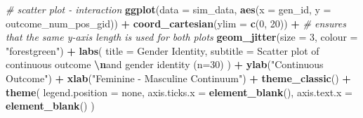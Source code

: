\documentclass[
]{book}
\newenvironment{Shaded}{\begin{snugshade}}{\end{snugshade}}
\newcommand{\AttributeTok}[1]{\textcolor[rgb]{0.13,0.29,0.53}{#1}}
\newcommand{\CommentTok}[1]{\textcolor[rgb]{0.56,0.35,0.01}{\textit{#1}}}
\newcommand{\DecValTok}[1]{\textcolor[rgb]{0.00,0.00,0.81}{#1}}
\newcommand{\FunctionTok}[1]{\textcolor[rgb]{0.13,0.29,0.53}{\textbf{#1}}}
\newcommand{\NormalTok}[1]{#1}
\newcommand{\SpecialCharTok}[1]{\textcolor[rgb]{0.81,0.36,0.00}{\textbf{#1}}}
\newcommand{\StringTok}[1]{\textcolor[rgb]{0.31,0.60,0.02}{#1}}
\begin{document}
\begin{Shaded}
\begin{Highlighting}[]
\CommentTok{\# scatter plot {-} interaction}
\FunctionTok{ggplot}\NormalTok{(}\AttributeTok{data =}\NormalTok{ sim\_data, }\FunctionTok{aes}\NormalTok{(}\AttributeTok{x =}\NormalTok{ gen\_id, }\AttributeTok{y =}\NormalTok{ outcome\_num\_pos\_gid)) }\SpecialCharTok{+}
  \FunctionTok{coord\_cartesian}\NormalTok{(}\AttributeTok{ylim =} \FunctionTok{c}\NormalTok{(}\DecValTok{0}\NormalTok{, }\DecValTok{20}\NormalTok{)) }\SpecialCharTok{+} \CommentTok{\# ensures that the same y{-}axis length is used for both plots}
  \FunctionTok{geom\_jitter}\NormalTok{(}\AttributeTok{size =} \DecValTok{3}\NormalTok{, }\AttributeTok{colour =} \StringTok{"forestgreen"}\NormalTok{) }\SpecialCharTok{+}
  \FunctionTok{labs}\NormalTok{(}
    \AttributeTok{title =} \StringTok{\textquotesingle{}Gender Identity\textquotesingle{}}\NormalTok{,}
    \AttributeTok{subtitle =} \StringTok{\textquotesingle{}Scatter plot of continuous outcome }\SpecialCharTok{\textbackslash{}n}\StringTok{and gender identity (n=30)\textquotesingle{}}
\NormalTok{    ) }\SpecialCharTok{+}
  \FunctionTok{ylab}\NormalTok{(}\StringTok{"Continuous Outcome"}\NormalTok{) }\SpecialCharTok{+} \FunctionTok{xlab}\NormalTok{(}\StringTok{"Feminine {-} Masculine Continuum"}\NormalTok{) }\SpecialCharTok{+}
  \FunctionTok{theme\_classic}\NormalTok{() }\SpecialCharTok{+}
  \FunctionTok{theme}\NormalTok{(}
    \AttributeTok{legend.position =} \StringTok{\textquotesingle{}none\textquotesingle{}}\NormalTok{,}
    \AttributeTok{axis.ticks.x =} \FunctionTok{element\_blank}\NormalTok{(),}
    \AttributeTok{axis.text.x =} \FunctionTok{element\_blank}\NormalTok{()}
\NormalTok{  )}


\end{Highlighting}
\end{Shaded}
\end{document}

